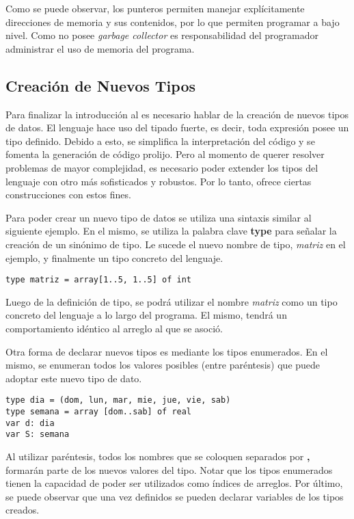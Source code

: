 \documentclass{article}
\begin{document}
Como se puede observar, los punteros permiten manejar explícitamente direcciones de memoria y sus contenidos, por lo que permiten programar a bajo nivel.
Como \Lang\space no posee \textit{garbage collector} es responsabilidad del programador administrar el uso de memoria del programa.

\subsection{Creación de Nuevos Tipos}

Para finalizar la introducción al \Lang\space es necesario hablar de la creación de nuevos tipos de datos.
El lenguaje hace uso del tipado fuerte, es decir, toda expresión posee un tipo definido.
Debido a esto, se simplifica la interpretación del código y se fomenta la generación de código prolijo.
Pero al momento de querer resolver problemas de mayor complejidad, es necesario poder extender los tipos del lenguaje con otro más sofisticados y robustos.
Por lo tanto, \Lang\space ofrece ciertas construcciones con estos fines.

Para poder crear un nuevo tipo de datos se utiliza una sintaxis similar al siguiente ejemplo.
En el mismo, se utiliza la palabra clave \textbf{type} para señalar la creación de un sinónimo de tipo.
Le sucede el nuevo nombre de tipo, \textit{matriz} en el ejemplo, y finalmente un tipo concreto del lenguaje.

\begin{lstlisting}
type matriz = array[1..5, 1..5] of int
\end{lstlisting}

Luego de la definición de tipo, se podrá utilizar el nombre \textit{matriz} como un tipo concreto del lenguaje a lo largo del programa. 
El mismo, tendrá un comportamiento idéntico al arreglo al que se asoció.

Otra forma de declarar nuevos tipos es mediante los tipos enumerados.
En el mismo, se enumeran todos los valores posibles (entre paréntesis) que puede adoptar este nuevo tipo de dato.

\begin{lstlisting}
type dia = (dom, lun, mar, mie, jue, vie, sab)
type semana = array [dom..sab] of real
var d: dia
var S: semana
\end{lstlisting}

Al utilizar paréntesis, todos los nombres que se coloquen separados por \textbf{,} formarán parte de los nuevos valores del tipo.
Notar que los tipos enumerados tienen la capacidad de poder ser utilizados como índices de arreglos.
Por último, se puede observar que una vez definidos se pueden declarar variables de los tipos creados.
\end{document}
